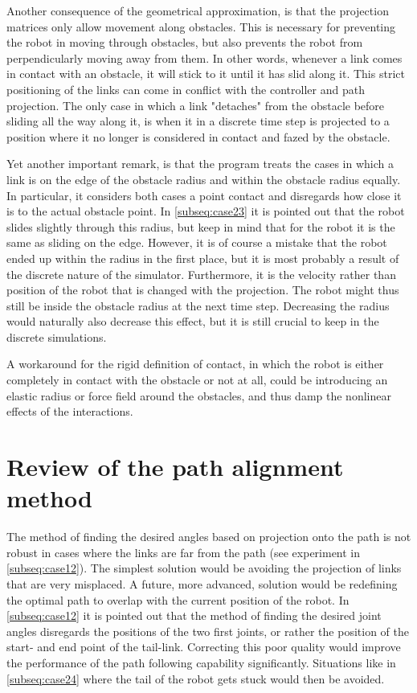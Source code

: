 Another consequence of the geometrical approximation, is that the projection matrices only allow movement along obstacles. This is necessary for preventing the robot in moving through obstacles, but also prevents the robot from perpendicularly moving away from them. In other words, whenever a link comes in contact with an obstacle, it will stick to it until it has slid along it. This strict positioning of the links can come in conflict with the controller and path projection. The only case in which a link "detaches" from the obstacle before sliding all the way along it, is when it in a discrete time step is projected to a position where it no longer is considered in contact and fazed by the obstacle.

Yet another important remark, is that the program treats the cases in which a link is on the edge of the obstacle radius and within the obstacle radius equally. In particular, it considers both cases a point contact and disregards how close it is to the actual obstacle point. In \ref{subseq:case23} it is pointed out that the robot slides slightly through this radius, but keep in mind that for the robot it is the same as sliding on the edge. However, it is of course a mistake that the robot ended up within the radius in the first place, but it is most probably a result of the discrete nature of the simulator. Furthermore, it is the velocity rather than position of the robot that is changed with the projection. The robot might thus still be inside the obstacle radius at the next time step. Decreasing the radius would naturally also decrease this effect, but it is still crucial to keep in the discrete simulations.

A workaround for the rigid definition of contact, in which the robot is either completely in contact with the obstacle or not at all, could be introducing an elastic radius or force field around the obstacles, and thus damp the nonlinear effects of the interactions. %


\section{Review of the path alignment method}

The method of finding the desired angles based on projection onto the path is not robust in cases where the links are far from the path (see experiment in \ref{subseq:case12}). The simplest solution would be avoiding the projection of links that are very misplaced. A future, more advanced, solution would be redefining the optimal path to overlap with the current position of the robot. In \ref{subseq:case12} it is pointed out that the method of finding the desired joint angles disregards the positions of the two first joints, or rather the position of the start- and end point of the tail-link. Correcting this poor quality would improve the performance of the path following capability significantly. Situations like in \ref{subseq:case24} where the tail of the robot gets stuck would then be avoided.

